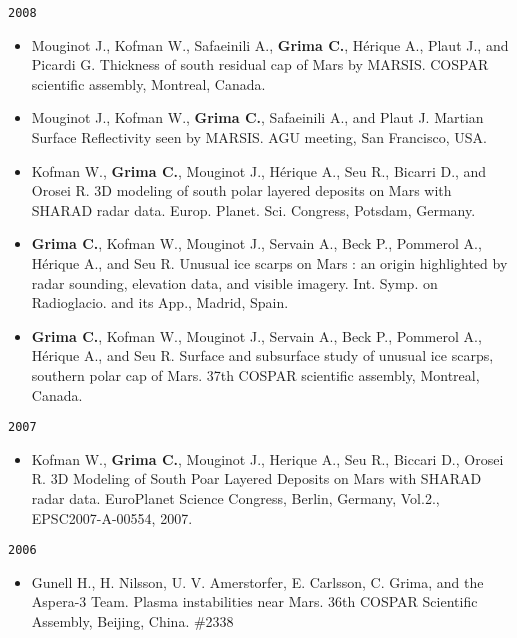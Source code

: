 \noindent\texttt{2008}

\begin{itemize}
\item
  Mouginot J., Kofman W., Safaeinili A., \textbf{Grima C.}, Hérique A.,
  Plaut J., and Picardi G. Thickness of south residual cap of Mars by
  MARSIS. COSPAR scientific assembly, Montreal, Canada.
\item
  Mouginot J., Kofman W., \textbf{Grima C.}, Safaeinili A., and Plaut J.
  Martian Surface Reflectivity seen by MARSIS. AGU meeting, San
  Francisco, USA.
\item
  Kofman W., \textbf{Grima C.}, Mouginot J., Hérique A., Seu R., Bicarri
  D., and Orosei R. 3D modeling of south polar layered deposits on Mars
  with SHARAD radar data. Europ. Planet. Sci. Congress, Potsdam,
  Germany.
\item
  \textbf{Grima C.}, Kofman W., Mouginot J., Servain A., Beck P.,
  Pommerol A., Hérique A., and Seu R. Unusual ice scarps on Mars : an
  origin highlighted by radar sounding, elevation data, and visible
  imagery. Int. Symp. on Radioglacio. and its App., Madrid, Spain.
\item
  \textbf{Grima C.}, Kofman W., Mouginot J., Servain A., Beck P.,
  Pommerol A., Hérique A., and Seu R. Surface and subsurface study of
  unusual ice scarps, southern polar cap of Mars. 37th COSPAR scientific
  assembly, Montreal, Canada.
\end{itemize}

\noindent\texttt{2007}

\begin{itemize}
\item
  Kofman W., \textbf{Grima C.}, Mouginot J., Herique A., Seu R., Biccari
  D., Orosei R. 3D Modeling of South Poar Layered Deposits on Mars with
  SHARAD radar data. EuroPlanet Science Congress, Berlin, Germany,
  Vol.2., EPSC2007-A-00554, 2007.
\end{itemize}

\noindent\texttt{2006}

\begin{itemize}
\item
  Gunell H., H. Nilsson, U. V. Amerstorfer, E. Carlsson, C. Grima, and
  the Aspera-3 Team. Plasma instabilities near Mars. 36th COSPAR
  Scientific Assembly, Beijing, China. \#2338
\end{itemize}